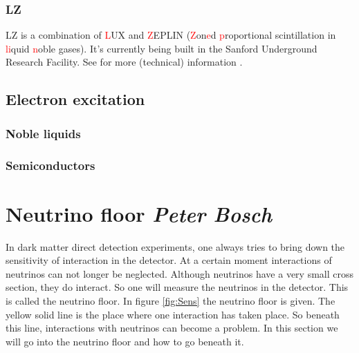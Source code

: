 \documentclass{article}
\begin{document}
\subsubsection{LZ}
LZ is a combination of \textcolor{red}{L}UX and \textcolor{red}{Z}EPLIN (\textcolor{red}{Z}on\textcolor{red}{e}d \textcolor{red}{p}roportional scintillation in \textcolor{red}{li}quid \textcolor{red}{n}oble gases). It's currently being built in the Sanford Underground Research Facility. See for more (technical) information \cite{Akerib:2015cja,Mount:2017qzi}.

\subsection{Electron excitation}
\subsubsection{Noble liquids}
\subsubsection{Semiconductors}

 

\FloatBarrier
\section{Neutrino floor \small{\textit{Peter Bosch}}}
\label{sec:floor}
In dark matter direct detection experiments, one always tries to bring down the sensitivity of interaction in the detector. At a certain moment interactions of neutrinos can not longer be neglected. Although neutrinos have a very small cross section, they do interact. So one will measure the neutrinos in the detector. This is called the neutrino floor. In figure \ref{fig:Sens} the neutrino floor is given. The yellow solid line is the place where one interaction has taken place. So beneath this line, interactions with neutrinos can become a problem. In this section we will go into the neutrino floor and how to go beneath it.
\end{document}
